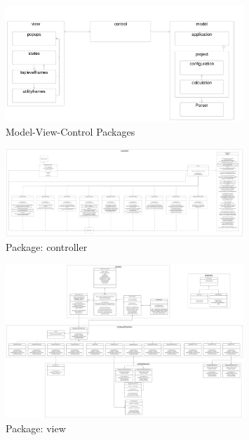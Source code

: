 \documentclass[parskip=full]{scrartcl} %
\begin{document}
\hypertarget{mvc}{
\begin{figure}[hbt!]
  \centering
\includegraphics[width=0.8\textwidth]
        {pictures/mvc.png}
  \caption{Model-View-Control Packages}
  \label{fig:mvc}
\end{figure}
}

\hypertarget{controller}{
\begin{figure}[hbt!]
  \centering
\includegraphics[width=0.8\textwidth]
        {pictures/controller.png}
  \caption{Package: controller}
  \label{fig:mvc}
\end{figure}
}

\hypertarget{view}{
\begin{figure}[hbt!]
  \centering
\includegraphics[width=0.8\textwidth]
        {pictures/view.png}
  \caption{Package: view}
  \label{fig:mvc}
\end{figure}
}
\end{document}
